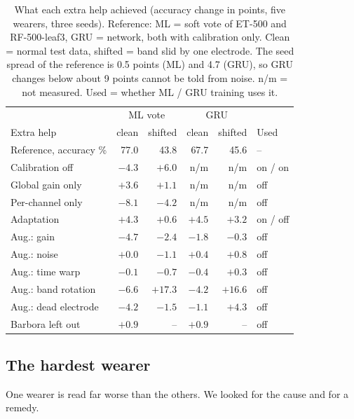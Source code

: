 \documentclass[conference]{IEEEtran}
\begin{document}
\begin{table}[!htb]
  \caption{What each extra help achieved (accuracy change in points, five wearers,
  three seeds). Reference: ML = soft vote of ET-500 and RF-500-leaf3, GRU = network,
  both with calibration only. Clean = normal test data, shifted = band slid by one
  electrode. The seed spread of the reference is 0.5 points (ML) and 4.7 (GRU), so
  GRU changes below about 9 points cannot be told from noise. n/m = not measured.
  Used = whether ML / GRU training uses it.}
  \label{tab:help}
  \centering
  \footnotesize
  \setlength{\tabcolsep}{2.6pt}
  \begin{tabular}{lrrrrl}
    \hline
    & \multicolumn{2}{c}{ML vote} & \multicolumn{2}{c}{GRU} & \\
    Extra help & clean & shifted & clean & shifted & Used \\
    \hline
    Reference, accuracy \% & 77.0 & 43.8 & 67.7 & 45.6 & -- \\
    Calibration off       & $-4.3$ & $+6.0$ & n/m & n/m & on / on \\
    Global gain only      & $+3.6$ & $+1.1$ & n/m & n/m & off \\
    Per-channel only      & $-8.1$ & $-4.2$ & n/m & n/m & off \\
    Adaptation            & $+4.3$ & $+0.6$ & $+4.5$ & $+3.2$ & on / off \\
    Aug.: gain            & $-4.7$ & $-2.4$ & $-1.8$ & $-0.3$ & off \\
    Aug.: noise           & $+0.0$ & $-1.1$ & $+0.4$ & $+0.8$ & off \\
    Aug.: time warp       & $-0.1$ & $-0.7$ & $-0.4$ & $+0.3$ & off \\
    Aug.: band rotation   & $-6.6$ & $+17.3$ & $-4.2$ & $+16.6$ & off \\
    Aug.: dead electrode  & $-4.2$ & $-1.5$ & $-1.1$ & $+4.3$ & off \\
    Barbora left out      & $+0.9$ & -- & $+0.9$ & -- & off \\
    \hline
  \end{tabular}
\end{table}
\subsection{The hardest wearer}
One wearer is read far worse than the others. We looked for the cause and for a
remedy.
\end{document}
